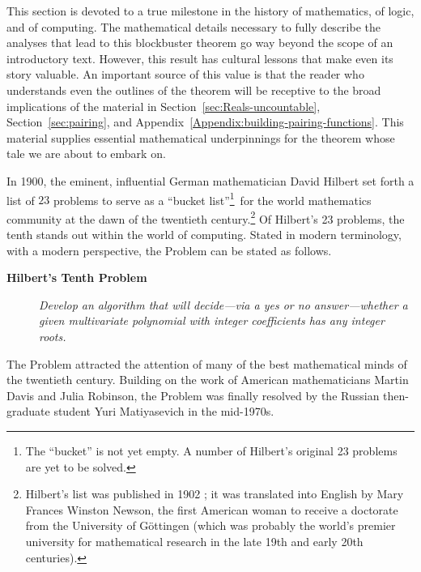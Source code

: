 This section is devoted to a true milestone in the history of mathematics, of logic, and of computing.  The mathematical details necessary to fully describe the analyses that lead to this blockbuster theorem go way beyond the scope of an introductory text.  However, this result has cultural lessons that make even its story valuable.  An important source of this value is that the reader who understands even the outlines of the theorem will be receptive to the broad implications of the material in Section~\ref{sec:Reals-uncountable}, Section~\ref{sec:pairing}, and Appendix~\ref{Appendix:building-pairing-functions}.  This material supplies essential mathematical underpinnings for the theorem whose tale we are about to embark on.

\medskip

   

In 1900, the eminent, influential German mathematician David Hilbert set forth a list of $23$ problems to serve as a ``bucket list''\footnote{The ``bucket'' is not yet empty.  A number of Hilbert's original 23 problems are yet to be solved.}~for the world mathematics community at the dawn of the twentieth century.\footnote{Hilbert's list was published in 1902 \cite{Hilbert02}; it was translated into English by Mary Frances Winston Newson, the first American woman to receive a doctorate from the University of G\"{o}ttingen (which was probably the world's premier university for mathematical research in the late 19th and early 20th centuries).}  Of Hilbert's 23 problems, the tenth stands out within the world of computing.  Stated in modern terminology, with a modern perspective, the Problem can be stated as follows.
\begin{description}
\item[{\bf Hilbert's Tenth Problem}]
{\it Develop an algorithm that will decide---via a {\sc yes} or {\sc no} answer---whether a given multivariate polynomial with integer coefficients has any integer roots.}
\end{description}
The Problem attracted the attention of many of the best mathematical minds of the twentieth century.  Building on the work of American mathematicians Martin Davis and Julia Robinson, the Problem was finally resolved by the Russian then-graduate student Yuri Matiyasevich in the mid-1970s.
  

\bigskip

